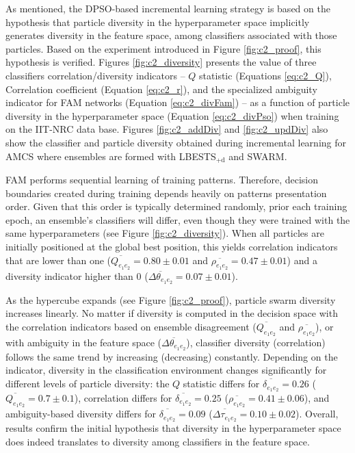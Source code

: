 As mentioned, the DPSO-based incremental learning strategy is based on the hypothesis that particle diversity in the hyperparameter space implicitly generates diversity in the feature space, among classifiers associated with those particles.
Based on the experiment introduced in Figure \ref{fig:c2_proof}, this hypothesis is verified.
Figures \ref{fig:c2_diversity} presents the value of three classifiers correlation/diversity indicators -- $Q$ statistic (Equations \ref{eq:c2_Q}), Correlation coefficient (Equation \ref{eq:c2_r}), and the specialized ambiguity indicator for FAM networks (Equation \ref{eq:c2_divFam}) -- as a function of particle diversity in the hyperparameter space (Equation \ref{eq:c2_divPso}) when training on the IIT-NRC data base.
Figures \ref{fig:c2_addDiv} and \ref{fig:c2_updDiv} also show the classifier and particle diversity obtained during incremental learning for AMCS where ensembles are formed with LBESTS$_\text{+d}$ and SWARM.

FAM performs sequential learning of training patterns.
Therefore, decision boundaries created during training depends heavily on patterns presentation order.
Given that this order is typically determined randomly, prior each training epoch, an ensemble's classifiers will differ, even though they were trained with the same hyperparameters (see Figure \ref{fig:c2_diversity}).
When all particles are initially positioned at the global best position, this yields correlation indicators that are lower than one ($\overline{Q_{e_1e_2}}=0.80\pm0.01$ and $\overline{\rho_{e_1e_2}}=0.47\pm0.01$) and a diversity indicator higher than 0 ($\overline{\Delta\theta_{e_1e_2}}=0.07\pm0.01$).

As the hypercube expands (see Figure \ref{fig:c2_proof}), particle swarm diversity increases linearly.
No matter if diversity is computed in the decision space with the correlation indicators based on ensemble disagreement ($\overline{Q_{e_1e_2}}$ and $\overline{\rho_{e_1e_2}}$), or with ambiguity in the feature space ($\overline{\Delta\theta_{e_1e_2}}$), classifier diversity (correlation) follows the same trend by increasing (decreasing) constantly.
Depending on the indicator, diversity in the classification environment changes significantly for different levels of particle diversity: the $Q$ statistic differs for $\overline{\delta_{e_1e_2}}=0.26$ ($\overline{Q_{e_1e_2}}=0.7\pm0.1$), correlation differs for $\overline{\delta_{e_1e_2}}=0.25$ ($\overline{\rho_{e_1e_2}}=0.41\pm0.06$), and ambiguity-based diversity differs for $\overline{\delta_{e_1e_2}}=0.09$ ($\overline{\Delta\tau_{e_1e_2}}=0.10\pm0.02$).
Overall, results confirm the initial hypothesis that diversity in the hyperparameter space does indeed translates to diversity among classifiers in the feature space.

